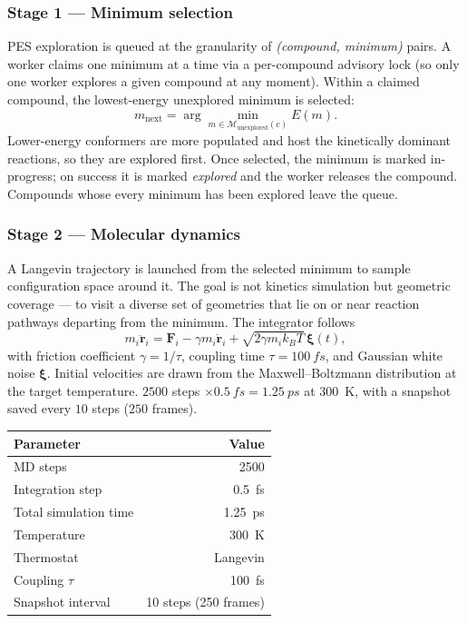\subsubsection{Stage 1 --- Minimum selection}
\label{sec:pes-select}

PES exploration is queued at the granularity of \emph{(compound, minimum)} pairs. A worker claims one minimum at a time via a per-compound advisory lock (so only one worker explores a given compound at any moment). Within a claimed compound, the lowest-energy unexplored minimum is selected:
\begin{equation}
    m_\text{next} = \arg\min_{m \in \mathcal{M}_\text{unexplored}(c)} E(m).
\end{equation}
Lower-energy conformers are more populated and host the kinetically dominant reactions, so they are explored first. Once selected, the minimum is marked in-progress; on success it is marked \emph{explored} and the worker releases the compound. Compounds whose every minimum has been explored leave the queue.


\subsubsection{Stage 2 --- Molecular dynamics}
\label{sec:pes-md}

A Langevin trajectory is launched from the selected minimum to sample configuration space around it. The goal is not kinetics simulation but geometric coverage --- to visit a diverse set of geometries that lie on or near reaction pathways departing from the minimum. The integrator follows
\begin{equation}
    m_i \ddot{\mathbf{r}}_i = \mathbf{F}_i - \gamma m_i \dot{\mathbf{r}}_i + \sqrt{2 \gamma m_i k_B T}\, \boldsymbol{\xi}(t),
\end{equation}
with friction coefficient $\gamma = 1/\tau$, coupling time $\tau = \SI{100}{fs}$, and Gaussian white noise $\boldsymbol{\xi}$. Initial velocities are drawn from the Maxwell--Boltzmann distribution at the target temperature. $2500$ steps $\times \SI{0.5}{fs} = \SI{1.25}{ps}$ at \SI{300}{K}, with a snapshot saved every $10$ steps ($250$ frames).

\noindent\begin{tabular}{lr}
\toprule
Parameter & Value \\
\midrule
MD steps & 2500 \\
Integration step & \SI{0.5}{fs} \\
Total simulation time & \SI{1.25}{ps} \\
Temperature & \SI{300}{K} \\
Thermostat & Langevin \\
Coupling $\tau$ & \SI{100}{fs} \\
Snapshot interval & 10 steps (250 frames) \\
\bottomrule
\end{tabular}

